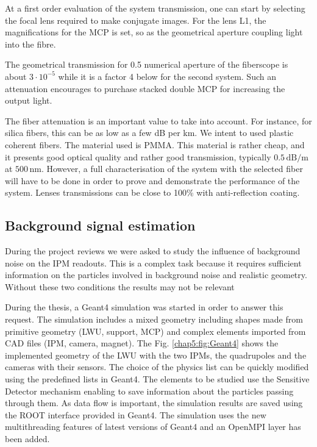 \begin{refsection}
  

  At a first order evaluation of the system transmission, one can start by selecting the focal lens required to make conjugate images. For the lens L1, the magnifications for the MCP is set, so as the geometrical aperture coupling light into the fibre.


  The geometrical transmission for 0.5 numerical aperture of the fiberscope is about $3 \cdot 10^{-5}$ while it is a factor 4 below for the second system. Such an attenuation encourages to purchase stacked double MCP for increasing the output light.

  The fiber attenuation is an important value to take into account. For instance, for silica fibers, this can be as low as a few dB per km. We intent to used plastic coherent fibers. The material used is PMMA. This material is rather cheap, and it presents good optical quality and rather good transmission, typically $0.5\,\mathrm{dB/m}$ at $500\,\mathrm{nm}$. However, a full characterisation of the system with the selected fiber will have to be done in order to prove and demonstrate the performance of the system. Lenses transmissions can be close to 100\% with anti-reflection coating.

  \subsection{Background signal estimation}
  During the project reviews we were asked to study the influence of background noise on the IPM readouts. This is a complex task because it requires sufficient information on the particles involved in background noise and realistic geometry. Without these two conditions the results may not be relevant

  
  During the thesis, a Geant4 simulation was started in order to answer this request. The simulation includes a mixed geometry including shapes made from primitive geometry (LWU, support, MCP) and complex elements imported from CAD files (IPM, camera, magnet). The Fig. \ref{chap5:fig:Geant4} shows the implemented geometry of the LWU with the two IPMs, the quadrupoles and the cameras with their sensors. The choice of the physics list can be quickly modified using the predefined lists in Geant4. The elements to be studied use the Sensitive Detector mechanism enabling to save information about the particles passing through them. As data flow is important, the simulation results are saved using the ROOT interface provided in Geant4. The simulation uses the new multithreading features of latest versions of Geant4 and an OpenMPI layer has been added.


\end{refsection}
